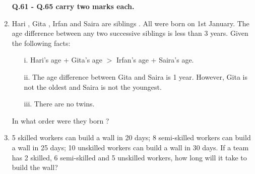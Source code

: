 \documentclass[12pt]{article}
\theoremstyle{remark}
\begin{document}
\begin{enumerate}
\textbf{Q.61 - Q.65 carry two marks each.}

\item Hari , Gita , Irfan  and Saira  are siblings . All were born on 1st January. The age difference between any two successive siblings  is less than 3 years. Given the following facts:
\begin{enumerate}
    \item[i.] Hari's age + Gita's age $>$ Irfan's age + Saira's age.
    \item[ii.] The age difference between Gita and Saira is 1 year. However, Gita is not the oldest and Saira is not the youngest.
    \item[iii.] There are no twins.
\end{enumerate}
In what order were they born ?
\begin{enumerate}
\end{enumerate}
\hfill{}

\item 5 skilled workers can build a wall in 20 days; 8 semi-skilled workers can build a wall in 25 days; 10 unskilled workers can build a wall in 30 days. If a team has 2 skilled, 6 semi-skilled and 5 unskilled workers, how long will it take to build the wall?
\begin{enumerate}
\end{enumerate}
\hfill{}


\end{enumerate}
\end{document}
